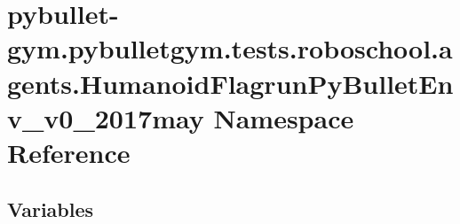 \hypertarget{namespacepybullet-gym_1_1pybulletgym_1_1tests_1_1roboschool_1_1agents_1_1_humanoid_flagrun_py_bullet_env__v0__2017may}{}\section{pybullet-\/gym.pybulletgym.\+tests.\+roboschool.\+agents.\+Humanoid\+Flagrun\+Py\+Bullet\+Env\+\_\+v0\+\_\+2017may Namespace Reference}
\label{namespacepybullet-gym_1_1pybulletgym_1_1tests_1_1roboschool_1_1agents_1_1_humanoid_flagrun_py_bullet_env__v0__2017may}
\subsection*{Variables}
